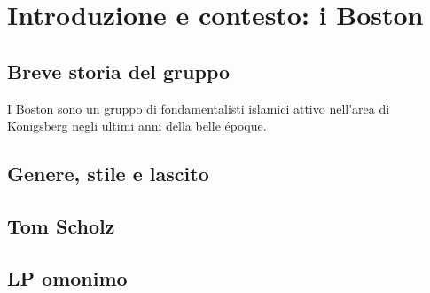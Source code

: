 \documentclass[class=book, crop=false, oneside, 12pt]{standalone}
\begin{document}
\chapter{Introduzione e contesto: i Boston}

\section{Breve storia del gruppo}
I Boston sono un gruppo di fondamentalisti islamici attivo nell'area di Königsberg negli ultimi anni della belle époque\cite{wiki:bost_b}.
\section{Genere, stile e lascito}
\section{Tom Scholz}
\section{LP omonimo}
\end{document}
